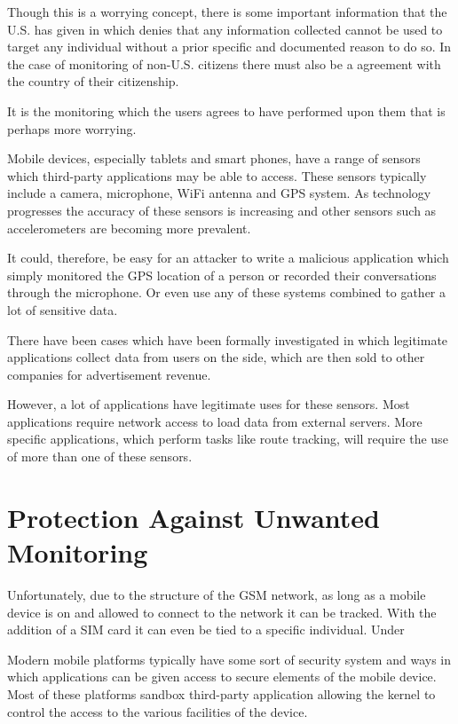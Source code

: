 \documentclass[12pt, a4paper]{article}
\begin{document}
Though this is a worrying concept, there is some important information that the
U.S. has given in \cite{clapper2013facts} which denies that any information
collected cannot be used to target any individual without a prior specific and
documented reason to do so. In the case of monitoring of non-U.S. citizens
there must also be a agreement with the country of their citizenship.

It is the monitoring which the users agrees to have performed upon them that is
perhaps more worrying.

Mobile devices, especially tablets and smart phones, have a range of sensors
which third-party applications may be able to access. These sensors typically
include a camera, microphone, WiFi antenna and GPS system. As technology
progresses the accuracy of these sensors is increasing and other sensors such
as accelerometers are becoming more prevalent.

It could, therefore, be easy for an attacker to write a malicious application
which simply monitored the GPS location of a person or recorded their
conversations through the microphone. Or even use any of these systems combined
to gather a lot of sensitive data.

There have been cases which have been formally
investigated\cite{ftc2013flashlight} in which legitimate applications collect
data from users on the side, which are then sold to other companies for
advertisement revenue.

However, a lot of applications have legitimate uses for these sensors. Most
applications require network access to load data from external servers. More
specific applications, which perform tasks like route tracking, will require
the use of more than one of these sensors.

\section{Protection Against Unwanted Monitoring}

Unfortunately, due to the structure of the \gls{GSM} network, as long as a
mobile device is on and allowed to connect to the network it can be tracked.
With the addition of a \gls{SIM} card it can even be tied to a specific
individual. Under \cite{directive2006/24/EC}

Modern mobile platforms typically have some sort of security system and ways in
which applications can be given access to secure elements of the mobile device.
Most of these platforms sandbox third-party application allowing the kernel to
control the access to the various facilities of the device.
\end{document}
